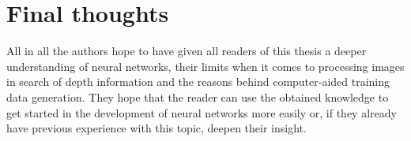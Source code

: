 \section{Final thoughts}

All in all the authors hope to have given all readers of this thesis a deeper understanding of neural networks, their limits when it comes to processing images in search of depth information and the reasons behind computer-aided training data generation. They hope that the reader can use the obtained knowledge to get started in the development of neural networks more easily or, if they already have previous experience with this topic, deepen their insight.

\filbreak